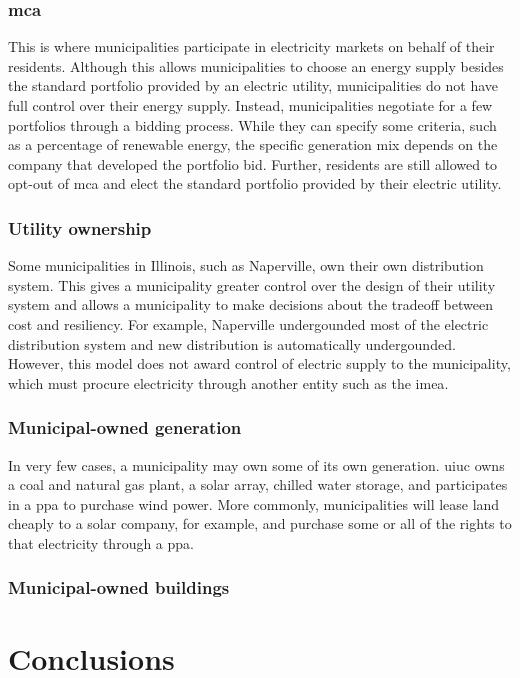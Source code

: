 \subsection{\ac{mca}}
This is where municipalities participate in electricity markets on behalf of
their residents. Although this allows municipalities to choose an energy supply
besides the standard portfolio provided by an electric utility, municipalities
do not have full control over their energy supply. Instead, municipalities
negotiate for a few portfolios through a bidding process. While they can specify
some criteria, such as a percentage of renewable energy, the specific generation
mix depends on the company that developed the portfolio bid. Further, residents
are still allowed to opt-out of \ac{mca} and elect the standard portfolio
provided by their electric utility.

\subsection{Utility ownership}
Some municipalities in Illinois, such as Naperville, own their own distribution
system. This gives a municipality greater control over the design of their
utility system and allows a municipality to make decisions about the tradeoff
between cost and resiliency. For example, Naperville undergounded most of the
electric distribution system and new distribution is automatically undergounded.
However, this model does not award control of electric supply to the
municipality, which must procure electricity through another entity such as the
\acf{imea}.

\subsection{Municipal-owned generation}
In very few cases, a municipality may own some of its own generation. \ac{uiuc}
owns a coal and natural gas plant, a solar array, chilled water storage, and
participates in a \ac{ppa} to purchase wind power. More commonly, municipalities
will lease land cheaply to a solar company, for example, and purchase some or all
of the rights to that electricity through a \ac{ppa}. 

\subsection{Municipal-owned buildings}

\fi

\chapter{Conclusions}
